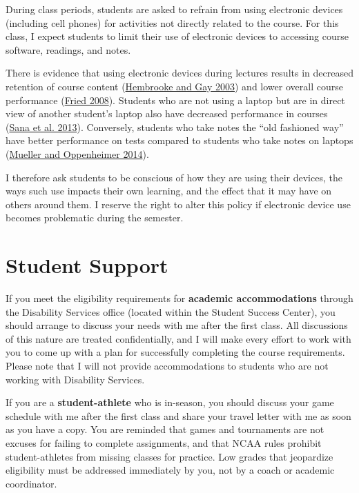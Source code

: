 \documentclass[]{book}
\theoremstyle{definition}
\theoremstyle{definition}
\theoremstyle{definition}
\theoremstyle{remark}
\begin{document}
During class periods, students are asked to refrain from using
electronic devices (including cell phones) for activities not directly
related to the course. For this class, I expect students to limit their
use of electronic devices to accessing course software, readings, and
notes.

There is evidence that using electronic devices during lectures results
in decreased retention of course content
(\href{https://link.springer.com/article/10.1007/BF02940852}{Hembrooke
and Gay 2003}) and lower overall course performance
(\href{https://www.sciencedirect.com/science/article/pii/S0360131506001436}{Fried
2008}). Students who are not using a laptop but are in direct view of
another student's laptop also have decreased performance in courses
(\href{https://www.sciencedirect.com/science/article/pii/S0360131512002254}{Sana
et al. 2013}). Conversely, students who take notes the ``old fashioned
way'' have better performance on tests compared to students who take
notes on laptops
(\href{http://journals.sagepub.com/doi/abs/10.1177/0956797614524581}{Mueller
and Oppenheimer 2014}).

I therefore ask students to be conscious of how they are using their
devices, the ways such use impacts their own learning, and the effect
that it may have on others around them. I reserve the right to alter
this policy if electronic device use becomes problematic during the
semester.

\section{Student Support}\label{student-support}

If you meet the eligibility requirements for \textbf{academic
accommodations} through the Disability Services office (located within
the Student Success Center), you should arrange to discuss your needs
with me after the first class. All discussions of this nature are
treated confidentially, and I will make every effort to work with you to
come up with a plan for successfully completing the course requirements.
Please note that I will not provide accommodations to students who are
not working with Disability Services.

If you are a \textbf{student-athlete} who is in-season, you should
discuss your game schedule with me after the first class and share your
travel letter with me as soon as you have a copy. You are reminded that
games and tournaments are not excuses for failing to complete
assignments, and that NCAA rules prohibit student-athletes from missing
classes for practice. Low grades that jeopardize eligibility must be
addressed immediately by you, not by a coach or academic coordinator.
\end{document}
